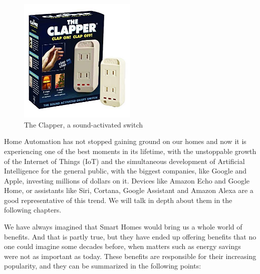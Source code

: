 \begin{figure}
	\centering
	\includegraphics[width=0.5\textwidth]{images/Chapter_02/the-clapper.jpg}
	\caption{The Clapper, a sound-activated switch}
	\label{fig:the-clapper}
\end{figure}

Home Automation has not stopped gaining ground on our homes and now it is experiencing one of the best moments
in its lifetime, with the unstoppable growth of the Internet of Things (IoT) and the simultaneous development of Artificial
Intelligence for the general public, with the biggest companies, like Google and Apple, investing millions of dollars on it.
Devices like Amazon Echo and Google Home, or assistants like Siri, Cortana, Google Assistant and Amazon Alexa are a
good representative of this trend. We will talk in depth about them in the following chapters.

We have always imagined that Smart Homes would bring us a whole world of benefits. And that is partly true, but
they have ended up offering benefits that no one could imagine some decades before, when matters such as energy
savings were not as important as today. These benefits are responsible for their increasing popularity, and they can be
summarized in the following points:

